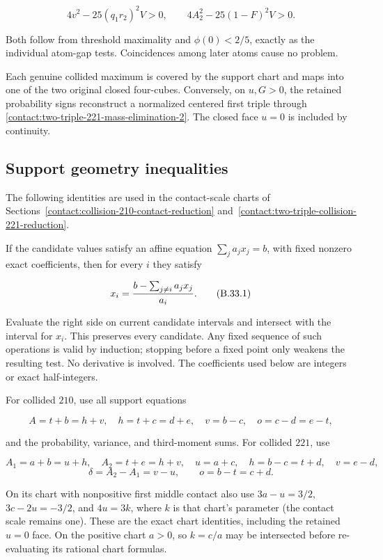 \[
 \boxed{4v^2-25(q_1r_2)^2V>0,\qquad
 4A_2^2-25(1-F)^2V>0.}
\tag{B.32.13}\label{contact:two-triple-221-mass-elimination-13}
\]

Both follow from threshold maximality and $\phi(0)<2/5$, exactly as the
individual atom-gap tests. Coincidences among later atoms cause no problem.

Each genuine collided maximum is covered by the support chart
and maps into one of the two original closed four-cubes. Conversely, on
$u,G>0$, the retained probability signs reconstruct a normalized centered
first triple through \eqref{contact:two-triple-221-mass-elimination-2}. The closed face $u=0$ is included by continuity.
\subsection{Support geometry inequalities}\label{contact:candidate-support-geometry-closure}
The following identities are used in the contact-scale charts of Sections~\ref{contact:collision-210-contact-reduction} and~\ref{contact:two-triple-collision-221-reduction}.



If the candidate values satisfy an affine equation
$\sum_j a_j x_j=b$, with fixed nonzero exact coefficients, then for every
$i$ they satisfy

\[
 x_i={b-\sum_{j\ne i}a_jx_j\over a_i}. \tag{B.33.1}\label{contact:candidate-support-geometry-closure-1}
\]

Evaluate the right side on current candidate intervals and intersect with
the interval for $x_i$. This preserves every candidate. Any fixed
sequence of such operations is valid by induction; stopping before a
fixed point only weakens the resulting test. No derivative is involved.
The coefficients used below are integers or exact half-integers.

For collided $210$, use all support equations

\[
 A=t+b=h+v,\quad h=t+c=d+e,\quad v=b-c,
 \quad o=c-d=e-t,
\]

and the probability, variance, and third-moment sums. For collided $221$, use

\[
 A_1=a+b=u+h,\quad A_2=t+e=h+v,\quad
 u=a+c,\quad h=b-c=t+d,\quad v=e-d,
\]
\[
 \delta=A_2-A_1=v-u,\qquad o=b-t=c+d.
\]

On its chart with nonpositive first middle contact also use $3a-u=3/2$, $3c-2u=-3/2$,
and $4u=3k$, where $k$ is that chart's parameter (the contact scale remains
one). These are the exact chart identities, including the retained $u=0$
face. On the positive chart $a>0$, so $k=c/a$ may be intersected before
re-evaluating its rational chart formulas.

